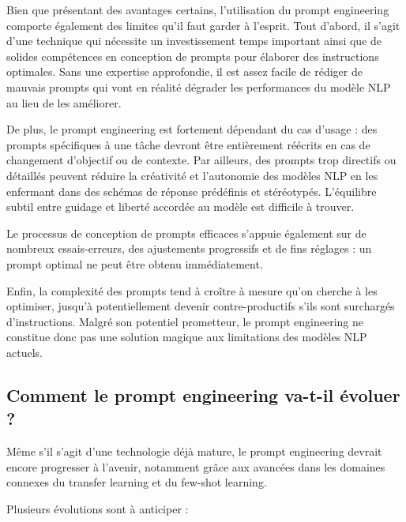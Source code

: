 Bien que présentant des avantages certains, l’utilisation du prompt engineering
comporte également des limites qu’il faut garder à l’esprit. Tout d’abord, il
s’agit d’une technique qui nécessite un investissement temps important ainsi que
de solides compétences en conception de prompts pour élaborer des instructions
optimales. Sans une expertise approfondie, il est assez facile de rédiger de
mauvais prompts qui vont en réalité dégrader les performances du modèle NLP au
lieu de les améliorer.

De plus, le prompt engineering est fortement dépendant du cas d’usage : des prompts
spécifiques à une tâche devront être entièrement réécrits en cas de changement d’objectif
ou de contexte. Par ailleurs, des prompts trop directifs ou détaillés peuvent réduire
la créativité et l’autonomie des modèles NLP en les enfermant dans des schémas de
réponse prédéfinis et stéréotypés. L’équilibre subtil entre guidage et liberté
accordée au modèle est difficile à trouver.

Le processus de conception de prompts efficaces s’appuie également sur de
nombreux essais-erreurs, des ajustements progressifs et de fins réglages : un prompt
optimal ne peut être obtenu immédiatement.

Enfin, la complexité des prompts tend à croître à mesure qu’on cherche à les
optimiser, jusqu’à potentiellement devenir contre-productifs s’ils sont surchargés
d’instructions. Malgré son potentiel prometteur, le prompt engineering ne constitue
donc pas une solution magique aux limitations des modèles NLP actuels.

\subsection*{Comment le prompt engineering va-t-il évoluer ?}

Même s’il s’agit d’une technologie déjà mature, le prompt engineering devrait encore
progresser à l’avenir, notamment grâce aux avancées dans les domaines connexes
du transfer learning et du few-shot learning.

Plusieurs évolutions sont à anticiper :

